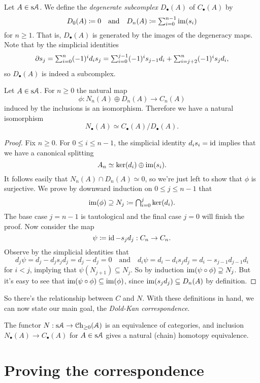 \begin{definition}
  Let $A \in \mathrm{s}\mathcal{A}$. We define the \textit{degenerate subcomplex}
  $D_\bullet(A)$ of $C_\bullet(A)$ by
  \[
  \textstyle{D_0(A) \coloneqq 0 \quad\text{and}\quad D_n(A) \coloneqq
    \sum_{i=0}^{n-1} \operatorname{im}(s_i)}
  \]
  for $n \ge 1$. That is, $D_\bullet(A)$ is generated by the images of
  the degeneracy maps. Note that by the simplicial identities
  \[
  \textstyle{\partial s_j = \sum_{i=0}^n (-1)^i d_i s_j = \sum_{i=0}^{j-1}
    (-1)^i s_{j-1} d_i + \sum_{i=j+2}^n (-1)^i s_j d_i,}
  \]
  so $D_\bullet(A)$ is indeed a subcomplex.
\end{definition}

\begin{proposition}
  Let $A \in \mathrm{s}\mathcal{A}$. For $n \ge 0$ the natural map
  \[
  \phi : N_n(A) \oplus D_n(A) \to C_n(A)
  \]
  induced by the inclusions is an isomorphism. Therefore we have a
  natural isomorphism
  \[
  N_\bullet(A) \simeq C_\bullet(A)/D_\bullet(A).
  \]
\end{proposition}

\begin{proof}
  Fix $n \ge 0$. For $0 \le i \le n - 1$, the simplicial identity
  $d_is_i = \operatorname{id}$ implies that we have a canonical splitting
  \[
  A_n \simeq \ker(d_i) \oplus \operatorname{im}(s_i).
  \]
  It follows easily that $N_n(A) \cap D_n(A) \simeq 0$, so we're just
  left to show that $\phi$ is surjective. We prove by downward
  induction on $0 \le j \le n-1$ that
  \[
  \textstyle{\operatorname{im}(\phi) \supseteq N_j \coloneqq\bigcap_{i=0}^j
    \ker(d_i).}
  \]
  The base case $j = n-1$ is tautological and the final case $j = 0$
  will finish the proof. Now consider the map
  \[
  \psi \coloneqq \operatorname{id} - s_jd_j : C_n \to C_n.
  \]
  Observe by the simplicial identities that
  \[
  d_j\psi = d_j - d_js_jd_j = d_j - d_j = 0 \quad\text{and}\quad
  d_i\psi = d_i - d_is_jd_j = d_i - s_{j-1}d_{j-1}d_i
  \]
  for $i < j$, implying that $\psi(N_{j+1}) \subseteq N_j$. So by
  induction $\operatorname{im}(\psi \circ \phi) \supseteq N_j$. But it's easy to see
  that $\operatorname{im}(\psi \circ \phi) \subseteq \operatorname{im}(\phi)$, since $\operatorname{im}(s_jd_j)
  \subseteq D_n(A)$ by definition.
\end{proof}

So there's the relationship between $C$ and $N$. With these
definitions in hand, we can now state our main goal, the
\textit{Dold-Kan correspondence}.

\begin{theorem}
  The functor $N : \mathrm{s}\mathcal{A} \to {\mathcal{C}\mathrm{h}}_{\ge 0}(\mathcal{A})$ is an equivalence of
  categories, and inclusion $N_\bullet(A) \to C_\bullet(A)$ for $A \in
  \mathrm{s}\mathcal{A}$ gives a natural (chain) homotopy equivalence.
\end{theorem}


\section{Proving the correspondence}


\nocite{goerssjardine, riehl-ssets, mathew-doldkan, weibel}




